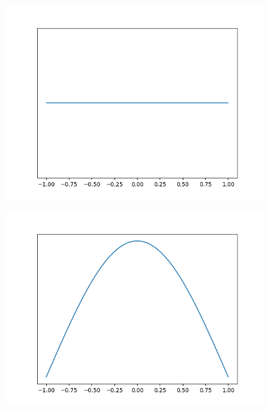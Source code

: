 \begin{figure}[!htbp]
    \centering
    \includegraphics[scale=0.5]
    {./content/figures/dists/uniform}
    \caption{}
    \label{fig:uniform}
\end{figure}

\begin{figure}[!htbp]
    \centering
    \includegraphics[scale=0.5]
    {./content/figures/dists/gaussian}
    \caption{}
    \label{fig:gaussian}
\end{figure}

